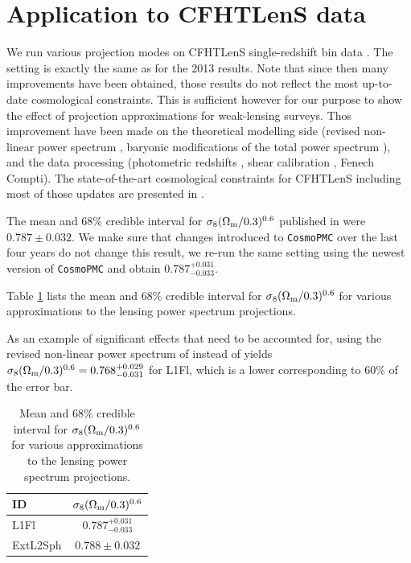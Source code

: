 \documentclass[useAMS,usenatbib]{mn2e} %
\begin{document}
\section{Application to CFHTLenS data}
\label{sec:cfhtlens}

We run various projection modes on CFHTLenS single-redshift bin data
\cite{CFHTLenS-2pt-notomo}. The setting is exactly the same as for the 2013
results. Note that since then many improvements have been obtained, those
results do not reflect the most up-to-date cosmological constraints. This is
sufficient however for our purpose to show the effect of projection
approximations for weak-lensing surveys. Thos improvement have been made on the
theoretical modelling side (revised non-linear power spectrum
\cite{2012ApJ...761..152T}, baryonic modifications of the total power spectrum
\cite{2015MNRAS.454.1958M}), and the data processing (photometric redshifts
\cite{2016MNRAS.463.3737C,joudaki/etal:2016}, shear calibration
\cite{KiDS-450}, Fenech Compti). The state-of-the-art cosmological constraints
for CFHTLenS including most of those updates are presented in
\cite{joudaki/etal:2016}.

The mean and 68\% credible interval for $\sigma_8 (\Omega_{\rm m}/0.3)^{0.6}$
published in \cite{CFHTLenS-2pt-notomo} were $0.787 \pm 0.032$. We make sure
that changes introduced to \texttt{CosmoPMC} over the last four years do not
change this result, we re-run the same setting using the newest version of
\texttt{CosmoPMC} and obtain $0.787^{+0.031}_{-0.033}$.

Table \ref{tab:CFHTLenS_Sigma8} lists the mean and 68\% credible interval for
$\sigma_8 (\Omega_{\rm m}/0.3)^{0.6}$ for various approximations to the lensing
power spectrum projections.

As an example of significant effects that need to be accounted for, using the
revised non-linear power spectrum of \cite{2012ApJ...761..152T} instead of
\cite{2003MNRAS.341.1311S} yields $\sigma_8 (\Omega_{\rm m}/0.3)^{0.6} =
0.768^{+0.029}_{-0.031}$ for L1Fl, which is a lower corresponding to 60\% of
the error bar.

\begin{table}

  \label{tab:CFHTLenS_Sigma8}

  \caption{Mean and 68\% credible interval for 
  $\sigma_8 (\Omega_{\rm m}/0.3)^{0.6}$ for various approximations to the lensing
  power spectrum projections.}

  \begin{tabular}{lc} \hline
  ID       & $\sigma_8 (\Omega_{\rm m}/0.3)^{0.6}$ \\ \hline
  L1Fl     & $0.787^{+0.031}_{-0.033}$ \\
  ExtL2Sph & $0.788 \pm 0.032$ \\ \hline
  \end{tabular}

\end{table}
\end{document}
